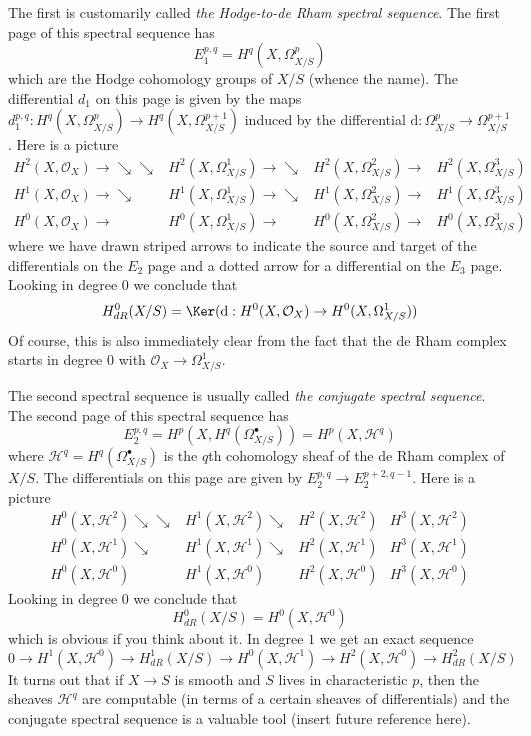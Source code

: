 \medskip\noindent
The first is customarily called {\it the Hodge-to-de Rham spectral sequence}.
The first page of this spectral sequence has
$$
E_1^{p, q} = H^q(X, \Omega^p_{X/S})
$$
which are the Hodge cohomology groups of $X/S$ (whence the name). The
differential $d_1$ on this page is given by the maps
$d_1^{p, q} : H^q(X, \Omega^p_{X/S}) \to H^q(X, \Omega^{p + 1}_{X/S})$
induced by the differential
$\text{d} : \Omega^p_{X/S} \to \Omega^{p + 1}_{X/S}$.
Here is a picture
$$
\begin{array}{cccc}H^2(X, \mathcal{O}_X) \longrightarrow\searrow\searrow & H^2(X, \Omega^1_{X/S}) \longrightarrow\searrow & H^2(X, \Omega^2_{X/S}) \longrightarrow & H^2(X, \Omega^3_{X/S}) \\ H^1(X, \mathcal{O}_X) \longrightarrow\searrow & H^1(X, \Omega^1_{X/S}) \longrightarrow\searrow & H^1(X, \Omega^2_{X/S}) \longrightarrow & H^1(X, \Omega^3_{X/S}) \\ H^0(X, \mathcal{O}_X) \longrightarrow & H^0(X, \Omega^1_{X/S}) \longrightarrow & H^0(X, \Omega^2_{X/S}) \longrightarrow & H^0(X, \Omega^3_{X/S})\end{array}
$$
where we have drawn striped arrows to indicate the source and target of
the differentials on the $E_2$ page and a dotted arrow for a differential
on the $E_3$ page. Looking in degree $0$ we conclude that
$$
H^0_{dR}(X/S) =
\Ker(\text{d} : H^0(X, \mathcal{O}_X) \to H^0(X, \Omega^1_{X/S}))
$$
Of course, this is also immediately clear from the fact that the
de Rham complex starts in degree $0$ with $\mathcal{O}_X \to \Omega^1_{X/S}$.

\medskip\noindent
The second spectral sequence is usually called
{\it the conjugate spectral sequence}. The second page of this
spectral sequence has
$$
E_2^{p, q} = H^p(X, H^q(\Omega^\bullet_{X/S})) = H^p(X, \mathcal{H}^q)
$$
where $\mathcal{H}^q = H^q(\Omega^\bullet_{X/S})$ is the $q$th
cohomology sheaf of the de Rham complex of $X/S$. The differentials
on this page are given by $E_2^{p, q} \to E_2^{p + 2, q - 1}$.
Here is a picture
$$
\begin{array}{cccc}H^0(X, \mathcal{H}^2) \searrow\searrow & H^1(X, \mathcal{H}^2) \searrow & H^2(X, \mathcal{H}^2) & H^3(X, \mathcal{H}^2) \\ H^0(X, \mathcal{H}^1) \searrow & H^1(X, \mathcal{H}^1) \searrow & H^2(X, \mathcal{H}^1) & H^3(X, \mathcal{H}^1) \\ H^0(X, \mathcal{H}^0) & H^1(X, \mathcal{H}^0) & H^2(X, \mathcal{H}^0) & H^3(X, \mathcal{H}^0)\end{array}
$$
Looking in degree $0$ we conclude that
$$
H^0_{dR}(X/S) = H^0(X, \mathcal{H}^0)
$$
which is obvious if you think about it. In degree $1$ we get an exact sequence
$$
0 \to H^1(X, \mathcal{H}^0) \to H^1_{dR}(X/S) \to
H^0(X, \mathcal{H}^1) \to H^2(X, \mathcal{H}^0) \to H^2_{dR}(X/S)
$$
It turns out that if $X \to S$ is smooth and $S$ lives in characteristic $p$,
then the sheaves $\mathcal{H}^q$ are computable (in terms of a certain
sheaves of differentials) and the conjugate spectral sequence is a valuable
tool (insert future reference here).

